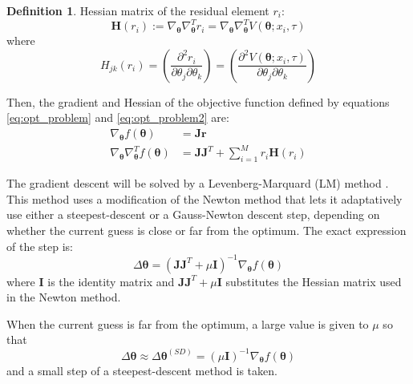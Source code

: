 \documentclass[12,twoside]{mammeTFM}
\theoremstyle{definition}
\newtheorem{definition}[thm]{Definition}
\theoremstyle{remark}
\begin{document}
\begin{definition} Hessian matrix of the residual element $r_i$:
\begin{equation}
\boldsymbol{H}(r_i) := \nabla_{\boldsymbol{\theta}} \nabla_{\boldsymbol{\theta}}^{T} r_i = \nabla_{\boldsymbol{\theta}} \nabla_{\boldsymbol{\theta}}^{T} V(\boldsymbol{\theta}; x_i, \tau)
\end{equation}
where
\begin{equation}
H_{jk}(r_i) = \left(\dfrac{\partial^2 r_i}{\partial \theta_j \partial \theta_k} \right) = \left(\dfrac{\partial^2 V(\boldsymbol{\theta}; x_i, \tau)}{\partial \theta_j\partial \theta_k} \right)
\end{equation}
\end{definition}

Then, the gradient and Hessian of the objective function defined by equations \ref{eq:opt_problem} and \ref{eq:opt_problem2} are:
\begin{align}
\nabla_{\boldsymbol{\theta}}f(\boldsymbol{\theta}) &= \boldsymbol{J}\boldsymbol{r} \\
\nabla_{\boldsymbol{\theta}}\nabla_{\boldsymbol{\theta}}^{T} f(\boldsymbol{\theta}) &= \boldsymbol{J}\boldsymbol{J}^{T} + \sum_{i = 1}^{M} r_i \boldsymbol{H}(r_i)
\end{align}

The gradient descent will be solved by a Levenberg-Marquard (LM) method \cite{mor78}. This method uses a modification of the Newton method that lets it adaptatively use either a steepest-descent or a Gauss-Newton descent step, depending on whether the current guess is close or far from the optimum. The exact expression of the step is:
\begin{equation}
\Delta \boldsymbol{\theta} = (\boldsymbol{J}\boldsymbol{J}^{T} + \mu \boldsymbol{I})^{-1} \nabla_{\boldsymbol{\theta}} f(\boldsymbol{\theta})
\end{equation}
where $\boldsymbol{I}$ is the identity matrix and $\boldsymbol{J}\boldsymbol{J}^{T} + \mu \boldsymbol{I}$ substitutes the Hessian matrix used in the Newton method.

When the current guess is far from the optimum, a large value is given to $\mu$ so that
\begin{equation}
\Delta \boldsymbol{\theta} \approx \Delta \boldsymbol{\theta}^{(SD)} = (\mu \boldsymbol{I})^{-1} \nabla_{\boldsymbol{\theta}} f(\boldsymbol{\theta})
\end{equation}
and a small step of a steepest-descent method is taken.
\end{document}
